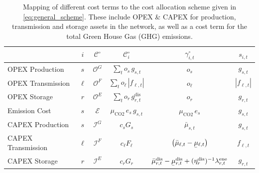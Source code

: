 \documentclass[11pt,twocolumn]{article}
\newcommand{\ubar}[1]{\underaccent{\bar}{#1}}
\newcommand{\state}[1][i]{s_{#1,t}}
\newcommand{\costfactor}{\gamma^\circ_{i,t}}
\newcommand{\generation}{g_{s,t}}
\newcommand{\capacitygeneration}{G_{s}}
\newcommand{\operationalpricegeneration}{o_{s}}
\newcommand{\capitalpricegeneration}{c_{s}}
\newcommand{\muuppergeneration}{\bar{\mu}_{s,t}}
\newcommand{\flow}{f_{\ell,t}}
\newcommand{\capacityflow}{F_{\ell}}
\newcommand{\operationalpriceflow}{o_\ell}
\newcommand{\capitalpriceflow}{c_{\ell}}
\newcommand{\mulowerflow}{\ubar{\mu}_{\ell,t}}
\newcommand{\muupperflow}{\bar{\mu}_{\ell,t}}
\newcommand{\storage}{g_{r,t}}
\newcommand{\storagedispatch}{\storage^\text{dis}}
\newcommand{\efficiency}{\eta_{r}}
\newcommand{\efficiencydispatch}{\efficiency^\text{dis}}
\newcommand{\operationalpricestorage}{o_r}
\newcommand{\capitalpricestorage}{c_r}
\newcommand{\capacitystorage}{G_r}
\newcommand{\mulowerstoragedispatch}{\ubar{\mu}_{r,t}^\text{dis}}
\newcommand{\muupperstoragedispatch}{\bar{\mu}_{r,t}^\text{dis}}
\newcommand{\mustateofcharge}{\lambda^\text{ene}_{r,t}}
\newcommand{\emission}{e_{s}}
\newcommand{\emissionprice}{\mu_{\text{CO2}}}
\newcommand{\cost}[1][\circ]{\mathcal{C}^{#1}}
\newcommand{\opexgeneration}{\mathcal{O}^G}
\newcommand{\opexflow}{\mathcal{O}^F}
\newcommand{\opexstorage}{\mathcal{O}^E}
\newcommand{\capexgeneration}{\mathcal{I}^G}
\newcommand{\capexflow}{\mathcal{I}^F}
\newcommand{\capexstorage}{\mathcal{I}^E}
\newcommand{\emissioncost}{\mathcal{E}}
\begin{document}
\begin{table}[t]
    \begin{center}
        \begin{tabular}{l|c|c|c|c|c}
        & $i$ & $\cost$ & $\cost_i$  & $\costfactor$ & $\state$  \\
        \toprule 
        OPEX Production & $s$ & $\opexgeneration$ & $\sum_{t} \operationalpricegeneration \, \generation$   & $\operationalpricegeneration$ & $\generation$ \\  
        OPEX Transmission  & $\ell$ & $\opexflow$ & $\sum_{t} \operationalpriceflow \, |\flow|  $ & $\operationalpriceflow$ & $|\flow|$ \\  
        OPEX Storage & $r$  & $\opexstorage$ & $\sum_{t} \operationalpricestorage \, \storagedispatch$ &  $\operationalpricestorage$ & $\storage$ \\
        \midrule
        Emission Cost & $s$ & $\emissioncost$ & $ \emissionprice \, \emission \, \generation$ & $\emissionprice \,\emission$ & $\generation$ \\
        \midrule   
        CAPEX Production & $s$ & $\capexgeneration$ & $ \capitalpricegeneration \capacitygeneration$ & $\muuppergeneration$ & $\generation$ \\
        CAPEX Transmission & $\ell$ & $\capexflow$ & $ \capitalpriceflow \capacityflow$ & $\left(\muupperflow - \mulowerflow \right)$ & $\flow$ \\
        CAPEX Storage & $r$ & $\capexstorage$ & $ \capitalpricestorage \capacitystorage$ & $ \muupperstoragedispatch - \mulowerstoragedispatch  + (\efficiencydispatch )^{-1} \mustateofcharge $ & $\storage$ \\
    \end{tabular}
    \end{center}
    \caption{Mapping of different cost terms to the cost allocation scheme given in \cref{eq:general_scheme}. These include OPEX \& CAPEX for production, transmission and storage assets in the network, as well as a cost term for the total Green House Gas (GHG) emissions.}
    \label{tab:cost_allocation_map}
\end{table}
\end{document}
